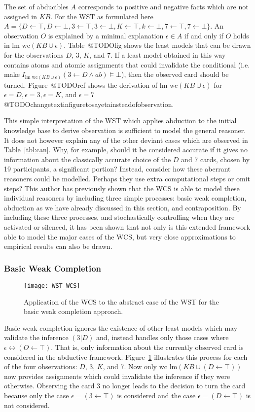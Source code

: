The set of abducibles $A$ corresponds to positive and negative facts which are not assigned in $KB$. For the WST as formulated here $A=\{D\leftarrow \top,D\leftarrow \bot,3\leftarrow \top,3\leftarrow \bot,K\leftarrow \top,k\leftarrow \bot,7\leftarrow \top,7\leftarrow \bot\}$.
 An observation $O$ is explained by a minimal explanation $\epsilon \in A$ if and only if $O$ holds in $\textrm{lm wc}(KB\cup\epsilon)$. Table~@TODOfig shows the least models that can be drawn for the observations $D$, $3$, $K$, and $7$. If a least model obtained in this way contains atoms and atomic assignments that could invalidate the conditional (i.e. make $I_{\textrm{lm wc}(KB\cup \epsilon)}(3\leftarrow D \land ab)\models \bot$), then the observed card should be turned. Figure~@TODOref shows the derivation of $\textrm{lm wc}(KB\cup \epsilon)$ for $\epsilon=D, \epsilon=3, \epsilon=K$, and $\epsilon=7$ @TODOchangetextinfiguretosayetainsteadofobservation.


This simple interpretation of the WST which applies abduction to the initial knowledge base to derive observation is sufficient to model the general reasoner. It does not however explain any of the other deviant cases which are observed in Table~\ref{tbl:can}. Why, for example, should it be considered accurate if it gives no information about the classically accurate choice of the $D$ and $7$ cards, chosen by 19 participants, a significant portion? Instead, consider how these aberrant reasoners could be modelled. Perhaps they use extra computational steps or omit steps? This author has previously shown that the WCS is able to model these individual reasoners \citep{breu2019weak} by including three simple processes: basic weak completion, abduction as we have already discussed in this section, and contraposition. By including these three processes, and stochastically controlling when they are activated or silenced, it has been shown that not only is this extended framework able to model the major cases of the WCS, but very close approximations to empirical results can also be drawn.

\subsubsection*{Basic Weak Completion}
\begin{figure}
\centering \texttt{[image: WST\_WCS]}
\caption{Application of the WCS to the abstract case of the WST for the basic weak completion approach.}
\label{wst_wcs}
\end{figure}
Basic weak completion ignores the existence of other least models which may validate the inference $(3|D)$ and, instead handles only those cases where $\epsilon \leftrightarrow (O\leftarrow \top)$. That is, only information about the currently observed card is considered in the abductive framework. Figure~\ref{wst_wcs} illustrates this process for each of the four observations: $D$, $3$, $K$, and $7$. Now only $\textrm{wc lm}(KB \cup (D \leftarrow \top))$ now provides assignments which could invalidate the inference if they were otherwise. Observing the card $3$ no longer leads to the decision to turn the card because only the case $\epsilon = (3\leftarrow \top)$ is considered and the case $\epsilon = (D \leftarrow \top)$ is not considered.

